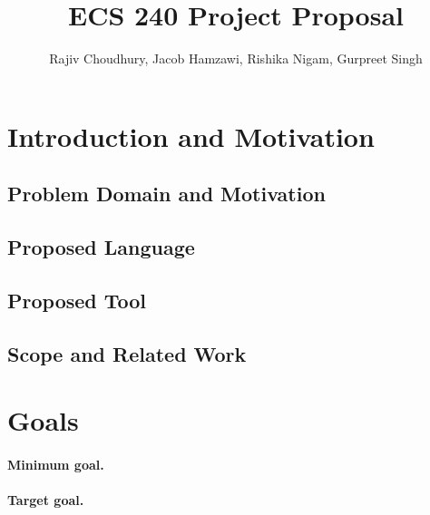 \documentclass[12pt, letterpaper]{article}
\title{ECS 240 Project Proposal}
\author{Rajiv Choudhury, Jacob Hamzawi, Rishika Nigam, Gurpreet Singh}
\begin{document}
\maketitle


\section{Introduction and Motivation}

\subsection{Problem Domain and Motivation}

\lipsum[1]

\subsection{Proposed Language}

\subsection{Proposed Tool}

\subsection{Scope and Related Work}

\section{Goals}

\paragraph{Minimum goal.}

\paragraph{Target goal.}
\end{document}
